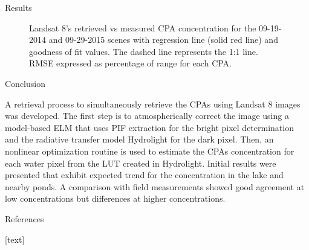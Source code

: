 \documentclass{beamer}
\begin{document}
\begin{frame}{}
\begin{columns}[t]
\begin{column}{.3\linewidth}
\begin{block}{Results}
\begin{figure}[htb]
  \caption{Landsat 8's retrieved vs measured CPA concentration for the 09-19-2014 and 09-29-2015 scenes with regression line (solid red line) and goodness of fit values. The dashed line represents the 1:1 line. RMSE expressed as percentage of range for each CPA. \label{fig:CPAsRetVSMea} } 
\end{figure}        


\end{block}  


\begin{block}{Conclusion}
  
\justifying\small A retrieval process to simultaneously retrieve the CPAs using Landsat 8 images was developed. The first step is to atmospherically correct the image using a model-based ELM that uses PIF extraction for the bright pixel determination and the radiative transfer model Hydrolight for the dark pixel. Then, an nonlinear optimization routine is used to estimate the CPAs concentration for each water pixel from the LUT created in Hydrolight. Initial results were presented that exhibit expected trend for the concentration in the lake and nearby ponds. A comparison with field measurements showed good agreement at low concentrations but differences at higher concentrations.
\vspace{.3cm}
\end{block}


\begin{block}{References} 
   
 { \scriptsize 
{}[text]
        
        
}
\end{block} 

\end{column}
\end{columns}
\end{frame}
\end{document}
